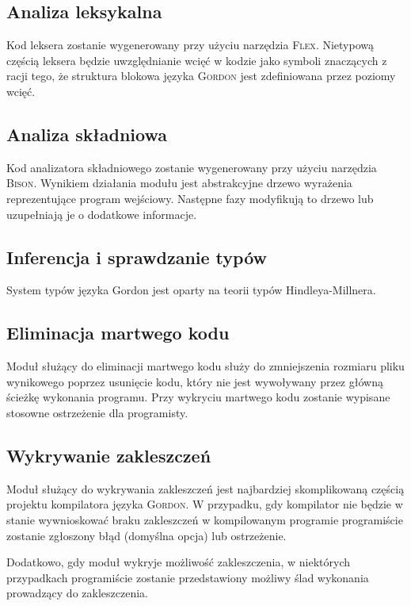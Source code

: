 \documentclass{documentation}
\begin{document}
\subsection{Analiza leksykalna}
\noindent Kod leksera zostanie wygenerowany przy użyciu narzędzia \textsc{Flex}. Nietypową
częścią leksera będzie uwzględnianie wcięć w kodzie jako symboli znaczących z racji tego,
że struktura blokowa języka \textsc{Gordon} jest zdefiniowana przez poziomy wcięć.

\subsection{Analiza składniowa}
\noindent Kod analizatora składniowego zostanie wygenerowany przy użyciu narzędzia \textsc{Bison}.
Wynikiem działania modułu jest abstrakcyjne drzewo wyrażenia reprezentujące program wejściowy.
Następne fazy modyfikują to drzewo lub uzupełniają je o dodatkowe informacje.

\subsection{Inferencja i sprawdzanie typów}
\noindent System typów języka Gordon jest oparty na teorii typów Hindleya-Millnera. 

\subsection{Eliminacja martwego kodu}
\noindent Moduł służący do eliminacji martwego kodu służy do zmniejszenia rozmiaru pliku wynikowego
poprzez usunięcie kodu, który nie jest wywoływany przez główną ścieżkę wykonania programu.
Przy wykryciu martwego kodu zostanie wypisane stosowne ostrzeżenie dla programisty.

\subsection{Wykrywanie zakleszczeń}
\noindent Moduł służący do wykrywania zakleszczeń jest najbardziej skomplikowaną częścią projektu
kompilatora języka \textsc{Gordon}. W przypadku, gdy kompilator nie będzie w stanie wywnioskować
braku zakleszczeń w kompilowanym programie programiście zostanie zgłoszony błąd (domyślna opcja)
lub ostrzeżenie.

Dodatkowo, gdy moduł wykryje możliwość zakleszczenia, w niektórych przypadkach programiście
zostanie przedstawiony możliwy ślad wykonania prowadzący do zakleszczenia. 
\end{document}
